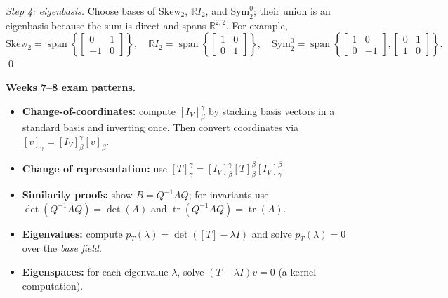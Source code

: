 \begin{extension}[title={Extension (Tutorial 7, Question 6, Method 2)}]
\emph{Step 4: eigenbasis.}
Choose bases of $\mathrm{Skew}_2$, $\mathbb{R}I_2$, and $\mathrm{Sym}_2^0$; their union is an eigenbasis because the sum is direct and spans $\mathbb{R}^{2,2}$.
For example,
\[
\mathrm{Skew}_2=\operatorname{span}\!\left\{\begin{bmatrix}0&1\\-1&0\end{bmatrix}\right\},\quad
\mathbb{R}I_2=\operatorname{span}\!\left\{\begin{bmatrix}1&0\\0&1\end{bmatrix}\right\},\quad
\mathrm{Sym}_2^0=\operatorname{span}\!\left\{\begin{bmatrix}1&0\\0&-1\end{bmatrix},\begin{bmatrix}0&1\\1&0\end{bmatrix}\right\}.
\]
\qed
\end{extension}

\begin{examtip}
\textbf{Weeks 7--8 exam patterns.}
\begin{itemize}
\item \textbf{Change-of-coordinates:} compute $[I_V]^{\gamma}_{\beta}$ by stacking basis vectors in a standard basis and inverting once.
Then convert coordinates via $[v]_\gamma=[I_V]^{\gamma}_{\beta}[v]_\beta$.
\item \textbf{Change of representation:} use $[T]^{\gamma}_{\gamma}=[I_V]^{\gamma}_{\beta}[T]^{\beta}_{\beta}[I_V]^{\beta}_{\gamma}$.
\item \textbf{Similarity proofs:} show $B=Q^{-1}AQ$; for invariants use $\det(Q^{-1}AQ)=\det(A)$ and $\operatorname{tr}(Q^{-1}AQ)=\operatorname{tr}(A)$.
\item \textbf{Eigenvalues:} compute $p_T(\lambda)=\det([T]-\lambda I)$ and solve $p_T(\lambda)=0$ over the \emph{base field}.
\item \textbf{Eigenspaces:} for each eigenvalue $\lambda$, solve $(T-\lambda I)v=0$ (a kernel computation).
\end{itemize}
\end{examtip}

